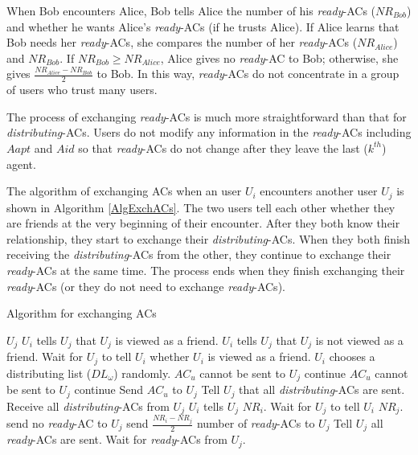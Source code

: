 When Bob encounters Alice, Bob tells Alice the number of his \textit{ready}-ACs (${NR}_{Bob}$) and whether he wants Alice's \textit{ready}-ACs (if he trusts Alice). If Alice learns that Bob needs her \textit{ready}-ACs, she compares the number of her \textit{ready}-ACs (${NR}_{Alice}$) and ${NR}_{Bob}$. If ${NR}_{Bob}\ge {NR}_{Alice}$, Alice gives no \textit{ready}-AC to Bob; otherwise, she gives $\frac{{NR}_{Alice}-{NR}_{Bob}}{2}$ to Bob. In this way, \textit{ready}-ACs do not concentrate in a group of users who trust many users. 

The process of exchanging \textit{ready}-ACs is much more straightforward than that for \textit{distributing}-ACs. Users do not modify any information in the \textit{ready}-ACs including $Aapt$ and $Aid$ so that \textit{ready}-ACs do not change after they leave the last ($k^{th}$) agent.

The algorithm of exchanging ACs when an user $U_i$ encounters another user $U_j$ is shown in Algorithm \ref{AlgExchACs}. The two users tell each other whether they are friends at the very beginning of their encounter. After they both know their relationship, they start to exchange their \textit{distributing}-ACs. When they both finish receiving the \textit{distributing}-ACs from the other, they continue to exchange their \textit{ready}-ACs at the same time. The process ends when they finish exchanging their \textit{ready}-ACs (or they do not need to exchange \textit{ready}-ACs).

\begin{algorithm} [hbtp]
\caption{Algorithm for exchanging ACs}\label{AlgExchACs}
\begin{algorithmic}[1]
 {$U_j$}
	\State $U_i$ tells $U_j$ that $U_j$ is viewed as a friend.
\Else
	\State $U_i$ tells $U_j$ that $U_j$ is not viewed as a friend.
\EndIf
\State Wait for $U_j$ to tell $U_i$ whether $U_i$ is viewed as a friend.
\State $U_i$ chooses a distributing list (${DL}_{\omega}$) randomly.
		\State ${AC}_u$ cannot be sent to $U_j$
		\State continue
	\EndIf
			\State ${AC}_u$ cannot be sent to $U_j$
			\State continue
		\EndIf
	\EndIf
	\State Send ${AC}_u$ to $U_j$
\EndFor
\State Tell $U_j$ that all \textit{distributing}-ACs are sent.
\State Receive all \textit{distributing}-ACs from $U_j$
	\State $U_i$ tells $U_j$ ${NR}_i$.
\EndIf
{}
	\State Wait for $U_j$ to tell $U_i$ ${NR}_j$.
		\State send no \textit{ready}-AC to $U_j$
	\Else
		\State send $\frac{{NR}_i-{NR}_j}{2}$ number of \textit{ready}-ACs to $U_j$
	\EndIf
	\State Tell $U_j$ all \textit{ready}-ACs are sent.
\EndIf
{}
	\State Wait for \textit{ready}-ACs from $U_j$.
\EndIf 
\EndProcedure

\end{algorithmic}
\end{algorithm}


